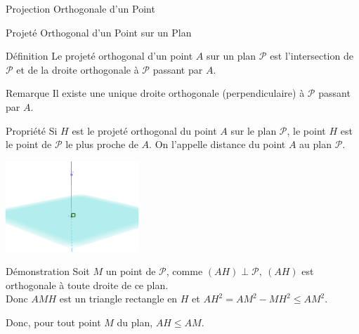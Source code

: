 \documentclass{cours}
\begin{document}
    \begin{Gpartie}{Projection Orthogonale d'un Point} 
        \begin{Spartie}{Projeté Orthogonal d'un Point sur un Plan} 
            \begin{SSSpartie}{Définition} 
                Le projeté orthogonal d'un point $A$ sur un plan $\mathcal{P}$ est l'intersection de $\mathcal{P}$ et de la droite orthogonale à $\mathcal{P}$ passant par $A$.
            \end{SSSpartie}
            \begin{SSSpartie}{Remarque} 
                Il existe une unique droite orthogonale (perpendiculaire) à $\mathcal{P}$ passant par $A$.
            \end{SSSpartie}
            \begin{SSSpartie}{Propriété} 
                Si $H$ est le projeté orthogonal du point $A$ sur le plan $\mathcal{P}$, le point $H$ est le point de $\mathcal{P}$ le plus proche de $A$. On l'appelle distance du point $A$ au plan $\mathcal{P}$.
                
                \begin{center}
                    \includegraphics[width=5cm]{rsc/12fig8.png}
                    \parbox{\linewidth}{}
                \end{center}

                \begin{SSSSpartie}{Démonstration} 
                    Soit $M$ un point de $\mathcal{P}$, comme $(AH)\perp\mathcal{P},~(AH)$ est orthogonale à toute droite de ce plan. \\ Donc $AMH$ est un triangle rectangle en $H$ et $AH^2=AM^2-MH^2\leq AM^2$.

                    Donc, pour tout point $M$ du plan, $AH\leq AM$.


\end{SSSSpartie}
\end{SSSpartie}
\end{Spartie}
\end{Gpartie}
\end{document}
